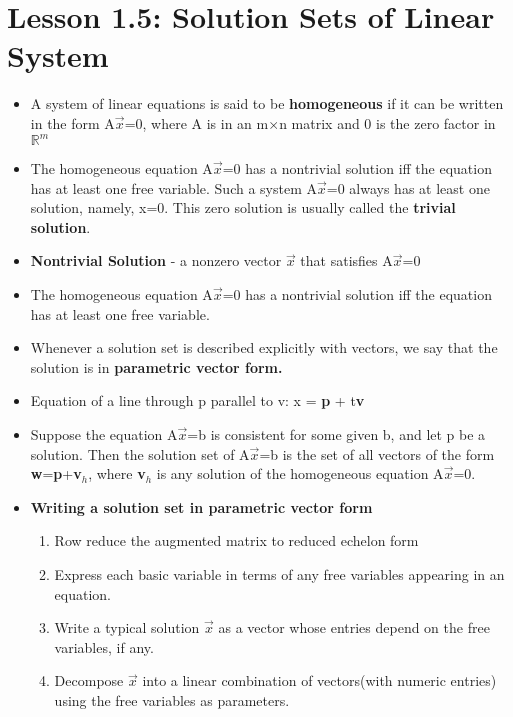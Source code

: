 \documentclass{report}
\newcommand{\Ax}{A$\vec{x}$}
\newcommand{\Vx}{$\vec{x}$}
\newcommand{\mxn}{m$\times$n}
\begin{document}
\section{Lesson 1.5: Solution Sets of Linear System}
	\begin{itemize}\addtolength{\leftskip}{2em}
		\item A system of linear equations is said to be \textbf{homogeneous} if it can be written in the form \Ax=0, where A is in an {\mxn} matrix and 0 is the zero factor in $\mathbb{R}^m$
		\item The homogeneous equation A\Vx=0 has a nontrivial solution iff the equation has at least one free variable.
		\newline Such a system \Ax=0 always has at least one solution, namely, x=0. This zero solution is usually called the \textbf{trivial solution}.
		\item \textbf{Nontrivial Solution} - a nonzero vector $\vec{x}$ that satisfies \Ax=0
		\item The homogeneous equation \Ax=0 has a nontrivial solution iff the equation has at least one free variable.
		\item Whenever a solution set is described explicitly with vectors, we say that the solution is in \textbf{parametric vector form.}
		\item Equation of a line through p parallel to v: x = \textbf{p} + t\textbf{v}
		\item Suppose the equation \Ax=b is consistent for some given b, and let p be a solution. Then the solution set of \Ax=b is the set of all vectors of the form \textbf{w}=\textbf{p}+\textbf{v}$_{h}$, where \textbf{v}$_{h}$ is any solution of the homogeneous equation \Ax=0.
		\item \textbf{Writing a solution set in parametric vector form}
			\begin{enumerate}\addtolength{\leftskip}{4em}
			\item Row reduce the augmented matrix to reduced echelon form
			\item Express each basic variable in terms of any free variables appearing in an equation.
			\item Write a typical solution {\Vx} as a vector whose entries depend on the free variables, if any.
			\item Decompose {\Vx} into a linear combination of vectors(with numeric entries) using the free variables as parameters.
			\end{enumerate}
	\end{itemize}
\end{document}
